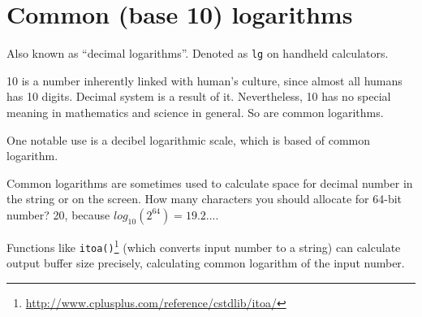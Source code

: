 \section{Common (base 10) logarithms}

Also known as ``decimal logarithms''.
Denoted as \texttt{lg} on handheld calculators.

10 is a number inherently linked with human's culture, since almost all humans has 10 digits.
Decimal system is a result of it.
Nevertheless, 10 has no special meaning in mathematics and science in general.
So are common logarithms.

One notable use is a decibel logarithmic scale, which is based of common logarithm.

Common logarithms are sometimes used to calculate space for decimal number in the string or on the screen.
How many characters you should allocate for 64-bit number? 20, because $log_{10}(2^{64}) = 19.2...$.

Functions like \texttt{itoa()}\footnote{\url{http://www.cplusplus.com/reference/cstdlib/itoa/}}
(which converts input number to a string) can calculate output buffer size precisely, 
calculating common logarithm of the input number.

